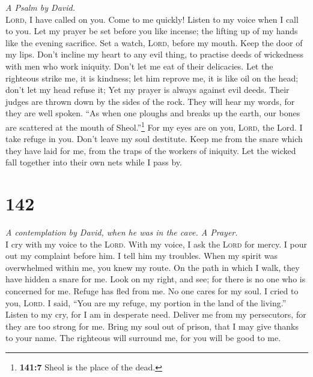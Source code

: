 \emph{A Psalm by David.}\\
 \textsc{Lord}, I have called on you. Come to me quickly!
Listen to my voice when I call to you.  Let my prayer be
set before you like incense; the lifting up of my hands like the evening
sacrifice.  Set a watch, \textsc{Lord}, before my mouth.
Keep the door of my lips.  Don't incline my heart to any
evil thing, to practise deeds of wickedness with men who work iniquity.
Don't let me eat of their delicacies.  Let the righteous
strike me, it is kindness; let him reprove me, it is like oil on the
head; don't let my head refuse it; Yet my prayer is always against evil
deeds.  Their judges are thrown down by the sides of the
rock. They will hear my words, for they are well spoken. 
``As when one ploughs and breaks up the earth, our bones are scattered
at the mouth of Sheol.''\footnote{\textbf{141:7} Sheol is the place of
  the dead.}  For my eyes are on you, \textsc{Lord}, the
Lord. I take refuge in you. Don't leave my soul destitute.
 Keep me from the snare which they have laid for me, from
the traps of the workers of iniquity.  Let the wicked
fall together into their own nets while I pass by.

\hypertarget{section-141}{%
\section{142}\label{section-141}}

\emph{A contemplation by David, when he was in the cave. A Prayer.}\\
 I cry with my voice to the \textsc{Lord}. With my voice,
I ask the \textsc{Lord} for mercy.  I pour out my
complaint before him. I tell him my troubles.  When my
spirit was overwhelmed within me, you knew my route. On the path in
which I walk, they have hidden a snare for me.  Look on my
right, and see; for there is no one who is concerned for me. Refuge has
fled from me. No one cares for my soul.  I cried to you,
\textsc{Lord}. I said, ``You are my refuge, my portion in the land of
the living.''  Listen to my cry, for I am in desperate
need. Deliver me from my persecutors, for they are too strong for me.
 Bring my soul out of prison, that I may give thanks to
your name. The righteous will surround me, for you will be good to me.

